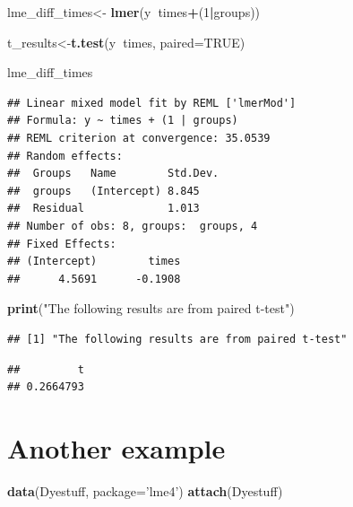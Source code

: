 \documentclass[]{book}
\newenvironment{Shaded}{\begin{snugshade}}{\end{snugshade}}
\newcommand{\KeywordTok}[1]{\textcolor[rgb]{0.13,0.29,0.53}{\textbf{#1}}}
\newcommand{\DataTypeTok}[1]{\textcolor[rgb]{0.13,0.29,0.53}{#1}}
\newcommand{\DecValTok}[1]{\textcolor[rgb]{0.00,0.00,0.81}{#1}}
\newcommand{\StringTok}[1]{\textcolor[rgb]{0.31,0.60,0.02}{#1}}
\newcommand{\OtherTok}[1]{\textcolor[rgb]{0.56,0.35,0.01}{#1}}
\newcommand{\OperatorTok}[1]{\textcolor[rgb]{0.81,0.36,0.00}{\textbf{#1}}}
\newcommand{\NormalTok}[1]{#1}
\begin{document}
\begin{Shaded}
\begin{Highlighting}[]
\NormalTok{lme_diff_times<-}\StringTok{ }\KeywordTok{lmer}\NormalTok{(y}\OperatorTok{~}\NormalTok{times}\OperatorTok{+}\NormalTok{(}\DecValTok{1}\OperatorTok{|}\NormalTok{groups)) }


\NormalTok{t_results<-}\KeywordTok{t.test}\NormalTok{(y}\OperatorTok{~}\NormalTok{times, }\DataTypeTok{paired=}\OtherTok{TRUE}\NormalTok{)}

\NormalTok{lme_diff_times}
\end{Highlighting}
\end{Shaded}

\begin{verbatim}
## Linear mixed model fit by REML ['lmerMod']
## Formula: y ~ times + (1 | groups)
## REML criterion at convergence: 35.0539
## Random effects:
##  Groups   Name        Std.Dev.
##  groups   (Intercept) 8.845   
##  Residual             1.013   
## Number of obs: 8, groups:  groups, 4
## Fixed Effects:
## (Intercept)        times  
##      4.5691      -0.1908
\end{verbatim}

\begin{Shaded}
\begin{Highlighting}[]
\KeywordTok{print}\NormalTok{(}\StringTok{"The following results are from paired t-test"}\NormalTok{)}
\end{Highlighting}
\end{Shaded}

\begin{verbatim}
## [1] "The following results are from paired t-test"
\end{verbatim}

\begin{Shaded}
\end{Shaded}

\begin{verbatim}
##         t 
## 0.2664793
\end{verbatim}

\section{Another example}\label{another-example}

\begin{Shaded}
\begin{Highlighting}[]
\KeywordTok{data}\NormalTok{(Dyestuff, }\DataTypeTok{package=}\StringTok{'lme4'}\NormalTok{)}
\KeywordTok{attach}\NormalTok{(Dyestuff)}
\end{Highlighting}
\end{Shaded}
\end{document}
